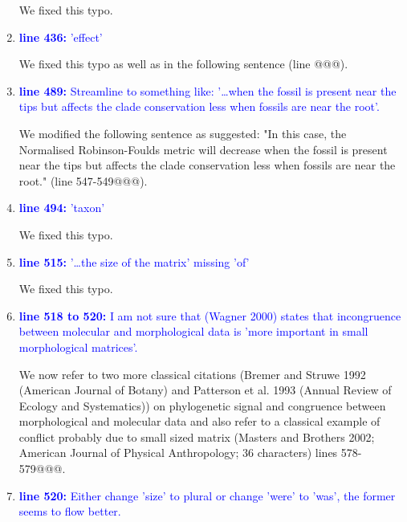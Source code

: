 \documentclass[12pt,letterpaper]{article}
\begin{document}
\begin{enumerate}
We fixed this typo.

\item{\textcolor{blue}{\textbf{line 436:} 'effect'}}

We fixed this typo as well as in the following sentence (line @@@).

\item{\textcolor{blue}{\textbf{line 489:} Streamline to something like: '…when the fossil is present near the tips but affects the clade conservation less when fossils are near the root'. }}

We modified the following sentence as suggested: "In this case, the Normalised Robinson-Foulds metric will decrease when the fossil is present near the tips but affects the clade conservation less when fossils are near the root." (line 547-549@@@).

\item{\textcolor{blue}{\textbf{line 494:} 'taxon'}}

We fixed this typo.

\item{\textcolor{blue}{\textbf{line 515:} '…the size of the matrix' missing 'of'}}

We fixed this typo.

\item{\textcolor{blue}{\textbf{line 518 to 520:} I am not sure that (Wagner 2000) states that incongruence between molecular and morphological data is 'more important in small morphological matrices'. }}

We now refer to two more classical citations (Bremer and Struwe 1992 (American Journal of Botany) and Patterson et al. 1993 (Annual Review of Ecology and Systematics)) on phylogenetic signal and congruence between morphological and molecular data and also refer to a classical example of conflict probably due to small sized matrix (Masters and Brothers 2002; American Journal of Physical Anthropology; 36 characters) lines 578-579@@@.

\item{\textcolor{blue}{\textbf{line 520:} Either change 'size' to plural or change 'were' to 'was', the former seems to flow better. }}


\end{enumerate}
\end{document}
